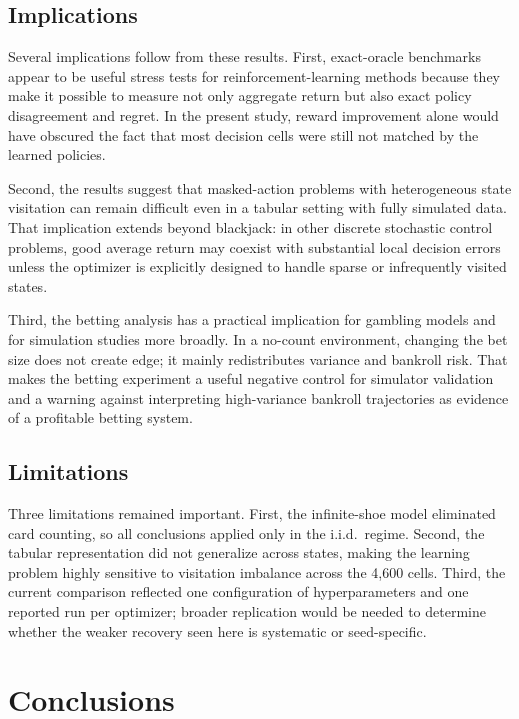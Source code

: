 \documentclass[12pt]{article}
\begin{document}
\subsection{Implications}

Several implications follow from these results.  First, exact-oracle benchmarks
appear to be useful stress tests for reinforcement-learning methods because they make
it possible to measure not only aggregate return but also exact policy disagreement
and regret.  In the present study, reward improvement alone would have obscured the
fact that most decision cells were still not matched by the learned policies.

Second, the results suggest that masked-action problems with heterogeneous state
visitation can remain difficult even in a tabular setting with fully simulated data.
That implication extends beyond blackjack: in other discrete stochastic control
problems, good average return may coexist with substantial local decision errors
unless the optimizer is explicitly designed to handle sparse or infrequently visited
states.

Third, the betting analysis has a practical implication for gambling models and for
simulation studies more broadly.  In a no-count environment, changing the bet size
does not create edge; it mainly redistributes variance and bankroll risk.  That makes
the betting experiment a useful negative control for simulator validation and a
warning against interpreting high-variance bankroll trajectories as evidence of a
profitable betting system.

\subsection{Limitations}

Three limitations remained important.  First, the infinite-shoe model eliminated card
counting, so all conclusions applied only in the i.i.d.\ regime.  Second, the tabular
representation did not generalize across states, making the learning problem highly
sensitive to visitation imbalance across the 4,600 cells.  Third, the current
comparison reflected one configuration of hyperparameters and one reported run per
optimizer; broader replication would be needed to determine whether the weaker
recovery seen here is systematic or seed-specific.

\section{Conclusions}
\end{document}
